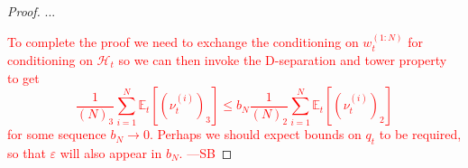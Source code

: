 \documentclass{article}
\newcommand{\seb}[1]{\xspace\textcolor{red}{#1 ---SB}\xspace} %
\theoremstyle{definition}
\newcommand{\Et}{\mathbb{E}_t}
\newcommand{\1}[1]{\mathbbm{1}_{#1}} %
\begin{document}
\begin{proof}
...

\seb{
To complete the proof we need to exchange the conditioning on $w_t^{(1:N)}$ for conditioning on $\mathcal{H}_t$ so we can then invoke the D-separation and tower property to get
\begin{equation*}
\frac{1}{(N)_3} \sum_{i=1}^N \Et [ (\nu_t^{(i)})_3 ]
\leq b_N \frac{1}{(N)_2} \sum_{i=1}^N \Et [ (\nu_t^{(i)})_2 ] 
\end{equation*}
for some sequence $b_N \to 0$.
Perhaps we should expect bounds on $q_t$ to be required, so that $\varepsilon$ will also appear in $b_N$.
}

\end{proof}
\end{document}
